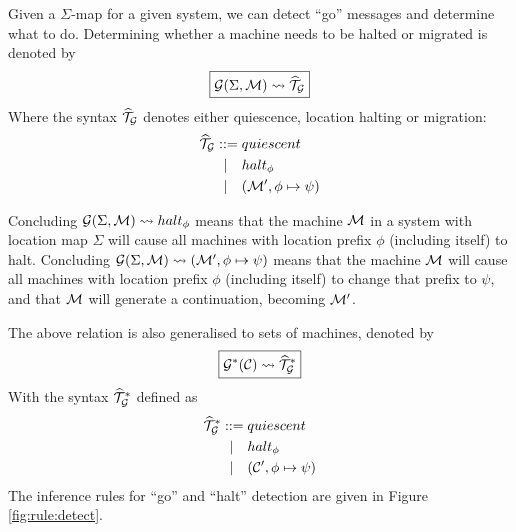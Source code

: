 Given a $\Sigma$-map for a given system, we can detect ``go'' messages and
determine what to do. Determining whether a machine needs to be halted or
migrated is denoted by
\begin{equation*}
\boxed{\mathcal{G}(\Sigma, \mathcal{M}) \leadsto \widehat{\mathcal{T}}_{\mathcal{G}}}
\end{equation*}
Where the syntax $\widehat{\mathcal{T}}_{\mathcal{G}}$ denotes either quiescence, location halting or
migration:
\begin{align*}
  \widehat{\mathcal{T}}_{\mathcal{G}} ::={}& quiescent \\
       |\quad& halt_\phi \\
       |\quad& (\mathcal{M}', \phi \mapsto \psi)
\end{align*}

Concluding $\mathcal{G}(\Sigma, \mathcal{M}) \leadsto halt_\phi$ means that the machine $\mathcal{M}$ in a
system with location map $\Sigma$ will cause all machines with location prefix
$\phi$ (including itself) to halt. Concluding $\mathcal{G}(\Sigma,\mathcal{M}) \leadsto (\mathcal{M}', \phi
\mapsto \psi)$ means that the machine $\mathcal{M}$ will cause all machines with location
prefix $\phi$ (including itself) to change that prefix to $\psi$, and that $\mathcal{M}$
will generate a continuation, becoming $\mathcal{M}'$.

The above relation is also generalised to sets of machines, denoted by
\begin{equation*}
\boxed{\mathcal{G}^*(\mathcal{C}) \leadsto \widehat{\mathcal{T}}_{\mathcal{G}}^*}
\end{equation*}
With the syntax $\widehat{\mathcal{T}}_{\mathcal{G}}^*$ defined as
\begin{align*}
  \widehat{\mathcal{T}}_{\mathcal{G}}^* ::={}& quiescent \\
         |\quad& halt_\phi \\
         |\quad& (\mathcal{C}', \phi \mapsto \psi)
\end{align*}
The inference rules for ``go'' and ``halt'' detection are given in Figure
\ref{fig:rule:detect}.

